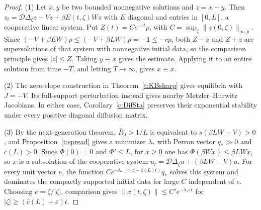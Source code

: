 \begin{proof}
(1) Let $x,y$ be two bounded nonnegative solutions and $z=x-y$. Then
$z_t=\mathcal D\Delta_\zeta z-Vz+\beta E(t,\zeta)Wz$ with $E$ diagonal and entries in $[0,L]$, a cooperative linear system. Put
$Z(t)=Ce^{-ct}p$, with $C=\sup_\zeta\|z(0,\zeta)\|_{\infty,p}$. Since $(-V+\beta EW)p\le(-V+\beta LW)p=-\mathbf1\le-cp$, both $Z-z$ and $Z+z$ are supersolutions
of that system with nonnegative initial data, so the comparison principle gives $|z|\le Z$. Taking $y\equiv\bar x$ gives the estimate. Applying it
to an entire solution from time $-T$, and letting $T\to\infty$, gives $x\equiv\bar x$.

(2) The zero-slope construction in Theorem~\ref{t:KBsharp} gives equilibria with $J=-V$. Its full-support perturbation instead gives nearby Metzler--Hurwitz Jacobians. In either case, Corollary~\ref{c:DifSta} preserves their exponential stability under every positive diagonal diffusion matrix.

(3) By the next-generation theorem, $\bar R_0>1/L$ is equivalent to $s(\beta LW-V)>0$, and Proposition~\ref{t:spread} gives a minimizer $\lambda_*$ with Perron vector
$q_*\gg0$ and $\bar c(L)>0$. Since $\Phi(0)=0$ and $\Phi'\le L$, for $x\ge0$ one has $\Phi(\beta Wx)\le\beta LWx$, so $x$ is a subsolution of the cooperative system
$u_t=\mathcal D\Delta_\zeta u+(\beta LW-V)u$. For every unit vector $e$, the function $Ce^{-\lambda_*(e\cdot\zeta-\bar c(L)t)}q_*$ solves this system and dominates the compactly supported initial data for large $C$
independent of $e$. Choosing $e=\zeta/|\zeta|$, comparison gives $\|x(t,\zeta)\|\le C'e^{-\lambda_*\varepsilon t}$ for $|\zeta|\ge(\bar c(L)+\varepsilon)t$.
\end{proof}

